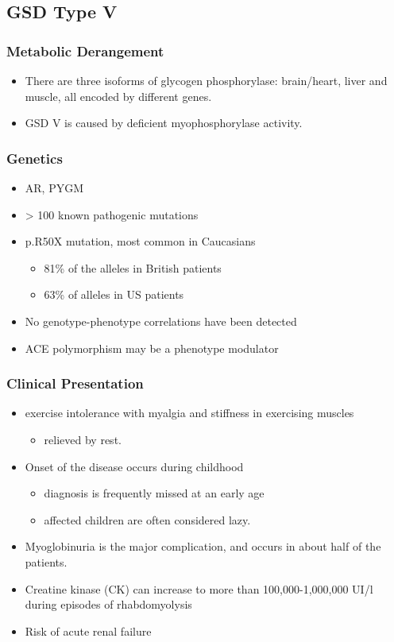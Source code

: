 \documentclass{scrartcl}
\begin{document}
\subsection{GSD Type V}
\label{sec:org5d64e70}
\subsubsection{Metabolic Derangement}
\label{sec:orgca0bdd9}
\begin{itemize}
\item There are three isoforms of glycogen phosphorylase: brain/heart,
liver and muscle, all encoded by different genes.
\item GSD V is caused by deficient myophosphorylase activity.
\end{itemize}

\subsubsection{Genetics}
\label{sec:org358e219}
\begin{itemize}
\item AR, PYGM
\item \textgreater{} 100 known pathogenic mutations
\item p.R50X mutation, most common in Caucasians
\begin{itemize}
\item 81\% of the alleles in British patients
\item 63\% of alleles in US patients
\end{itemize}
\item No genotype-phenotype correlations have been detected
\item ACE polymorphism may be a phenotype modulator
\end{itemize}

\subsubsection{Clinical Presentation}
\label{sec:org152a6dc}
\begin{itemize}
\item exercise intolerance with myalgia and stiffness in exercising muscles
\begin{itemize}
\item relieved by rest.
\end{itemize}
\item Onset of the disease occurs during childhood
\begin{itemize}
\item diagnosis is frequently missed at an early age
\item affected children are often considered lazy.
\end{itemize}
\item Myoglobinuria is the major complication, and occurs in about half of
the patients.
\item Creatine kinase (CK) can increase to more than 100,000-1,000,000
UI/l during episodes of rhabdomyolysis
\item Risk of acute renal failure
\end{itemize}
\end{document}
